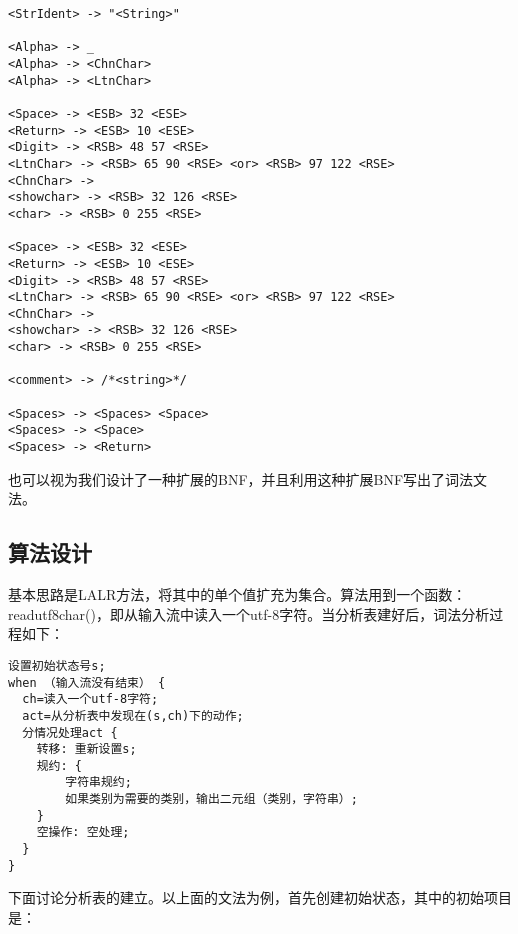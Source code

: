 \documentclass{article}
\begin{document}
\begin{CJK}{UTF8}{gbsn}
\begin{verbatim}
<StrIdent> -> "<String>"

<Alpha> -> _
<Alpha> -> <ChnChar>
<Alpha> -> <LtnChar>

<Space> -> <ESB> 32 <ESE>
<Return> -> <ESB> 10 <ESE>
<Digit> -> <RSB> 48 57 <RSE>
<LtnChar> -> <RSB> 65 90 <RSE> <or> <RSB> 97 122 <RSE>
<ChnChar> -> 
<showchar> -> <RSB> 32 126 <RSE>
<char> -> <RSB> 0 255 <RSE>

<Space> -> <ESB> 32 <ESE>
<Return> -> <ESB> 10 <ESE>
<Digit> -> <RSB> 48 57 <RSE>
<LtnChar> -> <RSB> 65 90 <RSE> <or> <RSB> 97 122 <RSE>
<ChnChar> -> 
<showchar> -> <RSB> 32 126 <RSE>
<char> -> <RSB> 0 255 <RSE>

<comment> -> /*<string>*/

<Spaces> -> <Spaces> <Space>
<Spaces> -> <Space>
<Spaces> -> <Return>
\end{verbatim}

也可以视为我们设计了一种扩展的BNF，并且利用这种扩展BNF写出了词法文法。

\subsection{算法设计}

基本思路是LALR方法，将其中的单个值扩充为集合。算法用到一个函数：readutf8char()，即从输入流中读入一个utf-8字符。当分析表建好后，词法分析过程如下：

\begin{verbatim}
设置初始状态号s;
when （输入流没有结束） {
  ch=读入一个utf-8字符;
  act=从分析表中发现在(s,ch)下的动作;
  分情况处理act {
    转移: 重新设置s;
    规约: {
        字符串规约;
        如果类别为需要的类别，输出二元组（类别，字符串）;
    }  
    空操作: 空处理;
  } 
}
\end{verbatim}

下面讨论分析表的建立。以上面的文法为例，首先创建初始状态，其中的初始项目是：

\vspace{1pc}


\end{CJK}
\end{document}

